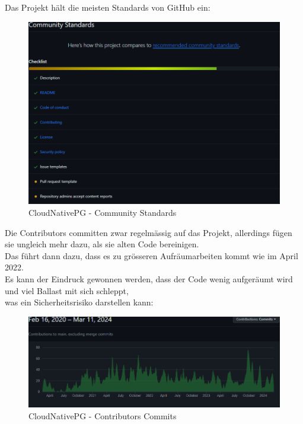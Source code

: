 \begin{flushleft}
    Das Projekt hält die meisten Standards von GitHub ein:
    \begin{figure}[H]
        \centering
        \includegraphics[width=0.75\linewidth]{source/implementation/evaluation/postgresql_ha_solutions/insights/cloudnativepg/community_standards}
        \caption{CloudNativePG - Community Standards}
        \label{fig:community_standards_cloudnativepg}
    \end{figure}
    Die Contributors committen zwar regelmässig auf das Projekt, allerdings fügen sie ungleich mehr dazu, als sie alten Code bereinigen.\\
    Das führt dann dazu, dass es zu grösseren Aufräumarbeiten kommt wie im April 2022.\\
    Es kann der Eindruck gewonnen werden, dass der Code wenig aufgeräumt wird und viel Ballast mit sich schleppt,\\
    was ein Sicherheitsrisiko darstellen kann:
    \begin{figure}[H]
        \centering
        \includegraphics[width=0.75\linewidth]{source/implementation/evaluation/postgresql_ha_solutions/insights/cloudnativepg/contributors_commits_cloudnative-pg_cloudnative-pg}
        \caption{CloudNativePG - Contributors Commits}
        \label{fig:contributors_commits_cloudnative-pg_cloudnative-pg}
    \end{figure}
    \begin{figure}[H]

\end{figure}
\end{flushleft}
